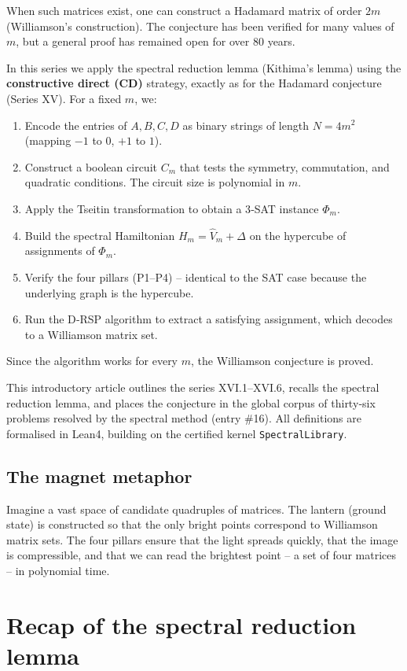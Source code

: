 \documentclass[11pt,a4paper]{article}
\begin{document}
When such matrices exist, one can construct a Hadamard matrix of order $2m$ (Williamson's construction). The conjecture has been verified for many values of $m$, but a general proof has remained open for over 80 years.

In this series we apply the spectral reduction lemma (Kithima's lemma) using the \textbf{constructive direct (CD)} strategy, exactly as for the Hadamard conjecture (Series XV). For a fixed $m$, we:
\begin{enumerate}
\item Encode the entries of $A,B,C,D$ as binary strings of length $N = 4m^2$ (mapping $-1$ to $0$, $+1$ to $1$).
\item Construct a boolean circuit $C_m$ that tests the symmetry, commutation, and quadratic conditions. The circuit size is polynomial in $m$.
\item Apply the Tseitin transformation to obtain a 3‑SAT instance $\Phi_m$.
\item Build the spectral Hamiltonian $H_m = \hat{V}_m + \Delta$ on the hypercube of assignments of $\Phi_m$.
\item Verify the four pillars (P1–P4) – identical to the SAT case because the underlying graph is the hypercube.
\item Run the D‑RSP algorithm to extract a satisfying assignment, which decodes to a Williamson matrix set.
\end{enumerate}
Since the algorithm works for every $m$, the Williamson conjecture is proved.

This introductory article outlines the series XVI.1–XVI.6, recalls the spectral reduction lemma, and places the conjecture in the global corpus of thirty‑six problems resolved by the spectral method (entry \#16). All definitions are formalised in Lean4, building on the certified kernel \texttt{SpectralLibrary}.

\subsection{The magnet metaphor}

Imagine a vast space of candidate quadruples of matrices. The lantern (ground state) is constructed so that the only bright points correspond to Williamson matrix sets. The four pillars ensure that the light spreads quickly, that the image is compressible, and that we can read the brightest point – a set of four matrices – in polynomial time.

\section{Recap of the spectral reduction lemma}
\end{document}
